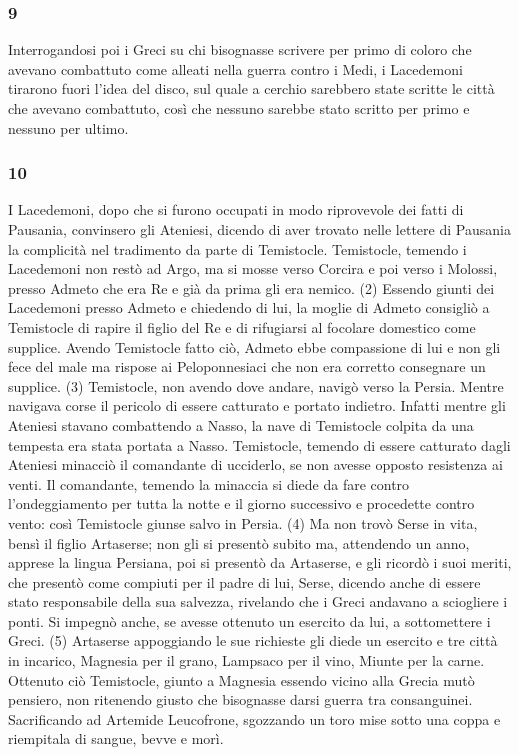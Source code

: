 \subsubsection*{9} Interrogandosi poi i Greci su chi bisognasse scrivere per primo di coloro che avevano combattuto come alleati nella guerra contro i Medi, i Lacedemoni tirarono fuori l'idea del disco, sul quale a cerchio sarebbero state scritte le città che avevano combattuto, così che nessuno sarebbe stato scritto per primo e nessuno per ultimo.

\subsubsection*{10} I Lacedemoni, dopo che si furono occupati in modo riprovevole dei fatti di Pausania, convinsero gli Ateniesi, dicendo di aver trovato nelle lettere di Pausania la complicità nel tradimento da parte di Temistocle. Temistocle, temendo i Lacedemoni non restò ad Argo, ma si mosse verso Corcira e poi verso i Molossi, presso Admeto che era Re e già da prima gli era nemico. (2) Essendo giunti dei Lacedemoni presso Admeto e chiedendo di lui, la moglie di Admeto consigliò a Temistocle di rapire il figlio del Re e di rifugiarsi al focolare domestico come supplice. Avendo Temistocle fatto ciò, Admeto ebbe compassione di lui e non gli fece del male ma rispose ai Peloponnesiaci che non era corretto consegnare un supplice. (3) Temistocle, non avendo dove andare, navigò verso la Persia. Mentre navigava corse il pericolo di essere catturato e portato indietro. Infatti mentre gli Ateniesi stavano combattendo a Nasso, la nave di Temistocle colpita da una tempesta era stata portata a Nasso. Temistocle, temendo di essere catturato dagli Ateniesi minacciò il comandante di ucciderlo, se non avesse opposto resistenza ai venti. Il comandante, temendo la minaccia si diede da fare contro l'ondeggiamento per tutta la notte e il giorno successivo e procedette contro vento: così Temistocle giunse salvo in Persia. (4) Ma non trovò Serse in vita, bensì il figlio Artaserse; non gli si presentò subito ma, attendendo un anno, apprese la lingua Persiana, poi si presentò da Artaserse, e gli ricordò i suoi meriti, che presentò come compiuti per il padre di lui, Serse, dicendo anche di essere stato responsabile della sua salvezza, rivelando che i Greci andavano a sciogliere i ponti. Si impegnò anche, se avesse ottenuto un esercito da lui, a sottomettere i Greci. (5) Artaserse appoggiando le sue richieste gli diede un esercito e tre città in incarico, Magnesia per il grano, Lampsaco per il vino, Miunte per la carne.  Ottenuto ciò Temistocle, giunto a Magnesia essendo vicino alla Grecia mutò pensiero, non ritenendo giusto che bisognasse darsi guerra tra consanguinei. Sacrificando ad Artemide Leucofrone, sgozzando un toro mise sotto una coppa e riempitala di sangue, bevve e morì. 

